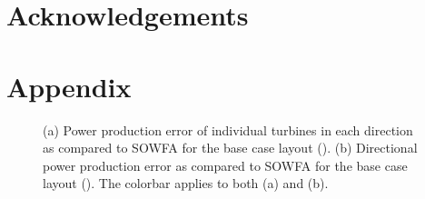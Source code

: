 \documentclass[conf]{new-aiaa}
\begin{document}
\section*{Acknowledgements}

\section*{Appendix}
\begin{figure}[ht]
	\centering
	\caption{(a) Power production error of individual turbines in each direction as compared to SOWFA for the base case layout (). (b) Directional power production error as compared to SOWFA for the base case layout ().  The colorbar applies to both (a) and (b).}
	\label{fig:basecase-power-error}
\end{figure}
\end{document}

